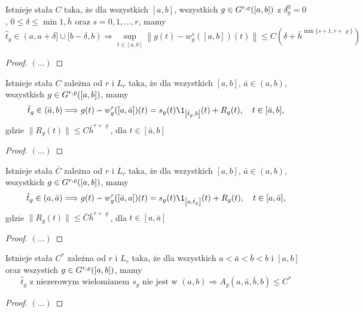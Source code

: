 \documentclass[oik, pdftex, robocza, man]{mgrwms}
\begin{document}
    \begin{cor}
        Istnieje stała $C$ taka, że dla wszystkich $[a,b]$, wszystkich $g \in G^{r,\varrho}([a,b])$ z $\delta_{g}^{0} = 0$, $0 \leq \delta \leq \min{1, \bar{h}}$ oraz $s=0,1,\dots,r$, mamy
        \begin{equation*}
            \hat{t}_{g} \in(a, a+\delta] \cup[b-\delta, b) \Longrightarrow  \sup_{t \in[a, b]}\left\|g(t)-w_{g}^{s}([a, b])(t)\right\| \leq C\left(\delta+\bar{h}^{\min \{s+1, r+\varrho\}}\right)
        \end{equation*}
    \end{cor}
    \begin{proof}
        $(\dots)$
    \end{proof}

    \begin{lemma}
        Istnieje stała $C$ zależna od $r$ i $L_{r}$ taka, że dla wszystkich $[a,b]$, $\bar{a} \in (a,b)$, wszystkich $g \in G^{r,\varrho}([a,b])$, mamy
        \begin{equation*}
            \hat{t}_{g} \in(\bar{a}, b) \Longrightarrow g(t)-w_{g}^{r}([a, \bar{a}])(t)=s_{g}(t) \1_{\left[\hat{t}_{g}, b\right]}(t)+R_{g}(t), \quad t \in[\bar{a}, b],
        \end{equation*}
        gdzie $\| R_{g}(t) \| \leq C\bar{h}^{r+\varrho}$, dla $t \in [\bar{a}, b]$
    \end{lemma}
    \begin{proof}
        $(\dots)$
    \end{proof}

    \begin{cor}
        Istnieje stała $\bar{C}$ zależna od $r$ i $L_{r}$ taka, że dla wszystkich $[a,b]$, $\bar{a} \in (a,b)$, wszystkich $g \in G^{r,\varrho}([a,b])$, mamy
        \begin{equation*}
            \hat{t}_{g} \in (a,\bar{a}) \Longrightarrow g(t)-w_{g}^{r}([\bar{a},a])(t)=s_{g}(t) \1_{\left[a,\hat{t}_{g}\right]}(t)+R_{g}(t), \quad t \in[a,\bar{a}],
        \end{equation*}
        gdzie $\| R_{g}(t) \| \leq \bar{C}\bar{h}^{r+\varrho}$, dla $t \in [a,\bar{a}]$
    \end{cor}
    \begin{proof}
        $(\dots)$
    \end{proof}

    \begin{stw}
        \label{2014_stw1}
        Istnieje stała $C^{*}$ zależna od $r$ i $L_{r}$ taka, że dla wszystkich $a < \bar{a} < \bar{b} < b$ i $[a,b]$ oraz wszystich $g \in G^{r,\varrho}([a,b])$, mamy
        \begin{equation*}
            \hat{t}_{g} \text{ z niezerowym wielomianem } s_{g} \text{ nie jest w } (a,b) \Longrightarrow A_{g}(a, \bar{a}, \bar{b}, b) \leq C^{*}
        \end{equation*}
    \end{stw}
    \begin{proof}
        $(\dots)$
    \end{proof}
\end{document}

